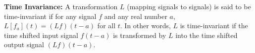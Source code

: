 {\bf Time Invariance:} A transformation $L$ (mapping signals to signals) is said to be time-invariant if for any signal $f$ and any real number $a$, $L[f_a](t)=(Lf)(t-a)$ for all $t$. In other words, $L$ is time-invariant if the time shifted input signal $f(t-a)$ is transformed by $L$ into the time shifted output signal $(Lf)(t-a)$.